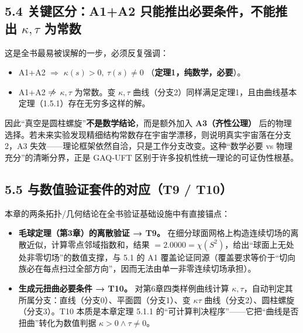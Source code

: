 \subsection{\texorpdfstring{5.4 关键区分：A1+A2
只能推出必要条件，\textbf{不能推出 \(\kappa,\tau\)
为常数}}{5.4 关键区分：A1+A2 只能推出必要条件，不能推出 \textbackslash kappa,\textbackslash tau 为常数}}\label{ux5173ux952eux533aux5206a1a2-ux53eaux80fdux63a8ux51faux5fc5ux8981ux6761ux4ef6ux4e0dux80fdux63a8ux51fa-kappatau-ux4e3aux5e38ux6570}

这是全书最易被误解的一步，必须反复强调：

\begin{itemize}
\tightlist
\item
  A1+A2 \(\Rightarrow\) \(\kappa(s)>0,\ \tau(s)\neq 0\)
  （\textbf{定理1，纯数学，必要}）。
\item
  A1+A2 \(\centernot\Rightarrow\) \(\kappa,\tau\) 为常数。变
  \(\kappa,\tau\)
  曲线（分支2）同样满足定理1，且由曲线基本定理（1.5.1）存在无穷多这样的解。
\end{itemize}

因此``真空是圆柱螺旋''\textbf{不是数学结论}，而是额外加入
\textbf{A3（齐性公理）}
后的物理选择。若未来实验发现精细结构常数存在宇宙学漂移，则说明真实宇宙落在分支2，A3
失效------理论框架依然自洽，只是工作分支改变。这种``数学必要 vs
物理充分''的清晰分界，正是 GAQ‑UFT
区别于许多投机性统一理论的可证伪性根基。

\subsection{5.5 与数值验证套件的对应（T9 /
T10）}\label{ux4e0eux6570ux503cux9a8cux8bc1ux5957ux4ef6ux7684ux5bf9ux5e94t9-t10}

本章的两条拓扑/几何结论在全书验证基础设施中有直接锚点：

\begin{itemize}
\tightlist
\item
  \textbf{毛球定理（第3章）的离散验证 → T9。}
  在细分球面网格上构造连续切场的离散近似，计算零点邻域指数和，结果
  \(=2.0000=\chi(S^2)\)，给出``球面上无处处非零切场''的数值支撑，与 5.1
  的 A1
  覆盖论证同源（覆盖要求等价于``切向族必在每点扫过全部方向''，因而无法由单一非零连续切场承担）。
\item
  \textbf{生成元扭曲必要条件 → T10。} 对第6章四类样例曲线计算
  \(\kappa,\tau\)，自动判定其所属分支：直线（分支0）、平面圆（分支1）、变
  \(\kappa\tau\) 曲线（分支2）、圆柱螺旋（分支3）。T10 本质是本章定理
  5.1.1 的``可计算判决程序''------它把``曲线是否扭曲''转化为数值判据
  \(\kappa>0\land\tau\neq0\)。
\end{itemize}

